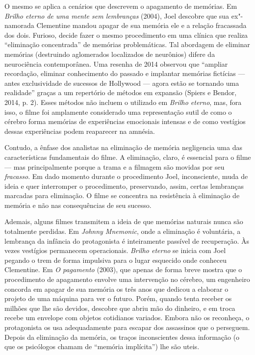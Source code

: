 O mesmo se aplica a cenários que descrevem o apagamento de memórias. Em
\emph{Brilho eterno de uma mente sem lembranças} (2004), Joel descobre
que sua ex"-namorada Clementine mandou apagar de sua memória ele e a
relação fracassada dos dois. Furioso, decide fazer o mesmo procedimento
em uma clínica que realiza ``eliminação concentrada'' de memórias
problemáticas. Tal abordagem de eliminar memórias (destruindo
aglomerados localizados de neurônios) difere da neurociência
contemporânea. Uma resenha de 2014 observou que ``ampliar recordação,
eliminar conhecimento do passado e implantar memórias fictícias ---
antes exclusividade de sucessos de Hollywood --- agora estão se tornando
uma realidade'' graças a um repertório de métodos em expansão (Spiers e
Bendor, 2014, p. 2). Esses métodos não incluem o utilizado em
\emph{Brilho eterno}, mas, fora isso, o filme foi amplamente considerado
uma representação sutil de como o cérebro forma memórias de experiências
emocionais intensas e de como vestígios dessas experiências podem
reaparecer na amnésia.

Contudo, a ênfase dos analistas na eliminação de memória negligencia uma
das características fundamentais do filme. A eliminação, claro, é
essencial para o filme --- mas principalmente porque a trama e a
filmagem são movidas por seu \emph{fracasso}. Em dado momento durante o
procedimento Joel, inconsciente, muda de ideia e quer interromper o
procedimento, preservando, assim, certas lembranças marcadas para
eliminação. O filme se concentra na resistência à eliminação de memória
e não nas consequências de seu sucesso.

Ademais, alguns filmes transmitem a ideia de que memórias naturais nunca
são totalmente perdidas. Em \emph{Johnny Mnemonic}, onde a eliminação é
voluntária, a lembrança da infância do protagonista é inteiramente
passível de recuperação. Às vezes vestígios permanecem operacionais.
\emph{Brilho eterno} se inicia com Joel pegando o trem de forma
impulsiva para o lugar esquecido onde conheceu Clementine. Em \emph{O
pagamento} (2003), que apenas de forma breve mostra que o procedimento
de apagamento envolve uma intervenção no cérebro, um engenheiro concorda
em apagar de sua memória os três anos que dedicou a elaborar o projeto
de uma máquina para ver o futuro. Porém, quando tenta receber os milhões
que lhe são devidos, descobre que abriu mão do dinheiro, e em troca
recebe um envelope com objetos cotidianos variados. Embora não os
reconheça, o protagonista os usa adequadamente para escapar dos
assassinos que o perseguem. Depois da eliminação da memória, os traços
inconscientes dessa informação (o que os psicólogos chamam de ``memória
implícita'') lhe são uteis.

